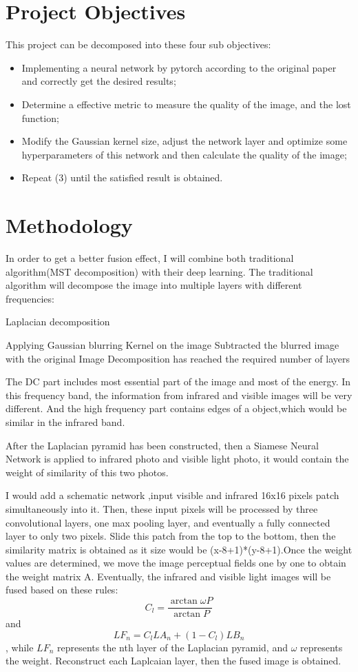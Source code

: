 \documentclass[a4paper,12pt]{article}
\begin{document}
\section{Project Objectives}
This project can be decomposed into these four sub objectives:
\begin{itemize}
    \item Implementing a neural network by pytorch according to the original paper and correctly get the desired results;
    \item Determine a effective metric to measure the quality of the image, and the lost function;
    \item Modify the Gaussian kernel size, adjust the network layer and optimize some hyperparameters of this network and then calculate the quality of the image;
    \item Repeat (3) until the satisfied result is obtained.
\end{itemize}
\section{Methodology}
In order to get a better fusion effect, I will combine both traditional algorithm(MST decomposition) with their deep learning. The traditional algorithm will decompose the image into multiple layers with different frequencies:\\
\begin{algorithm}

	\caption{Laplacian decomposition}
	\label{alg1}
	\begin{algorithmic}[1] 
		\REPEAT
		\STATE Applying Gaussian blurring Kernel on the image
		\STATE Subtracted the blurred image with the original Image
		\UNTIL Decomposition has reached the required number of layers
	\end{algorithmic}  
\end{algorithm}

The DC part includes most essential part of the image and most of the energy. In this frequency band, the information from infrared and visible images will be very different. And the high frequency part contains edges of a object,which would be similar in the infrared band. 

After the Laplacian pyramid has been constructed, then a Siamese Neural Network is applied to infrared photo and visible light photo, it would contain the weight of similarity of this two photos.

I would add a schematic network ,input visible and infrared 16x16 pixels patch simultaneously into it. Then, these input pixels will be processed by three convolutional layers, one max pooling layer, and eventually a fully connected layer to only two pixels. Slide this patch from the top to the bottom, then the similarity matrix is obtained as it size would be (x-8+1)*(y-8+1).Once the weight values are determined, we move the image perceptual fields one by one to obtain the weight matrix A. Eventually, the infrared and visible light images will be fused based on these rules: $$C_l = \frac{\arctan{\omega P}}{\arctan{P}}$$ and $$LF_n = C_l  LA_n +(1-C_l) LB_n$$, while $ LF_n $ represents the nth layer of the Laplacian pyramid, and $\omega$ represents the weight. Reconstruct each Laplcaian layer, then the fused image is obtained.
\end{document}

